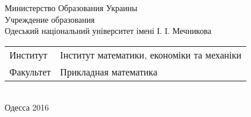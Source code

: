 \begin{titlepage}
  \begin{center}
   Министерство Образования Украины\\[1em]
    Учреждение образования\\
   Одеський національний університет імені І. І. Мечникова\\[1em]

    \begin{minipage}{\textwidth}
      \begin{flushleft}
        \begin{tabular}{ l l }
          Институт & Інститут математики, економіки та механіки\\
         Факультет   & Прикладная математика
        \end{tabular}
      \end{flushleft}
    \end{minipage}\\[1em]

   

   



    
   
    
    \vfill
    {\normalsize Одесса 2016}
  \end{center}
\end{titlepage}
